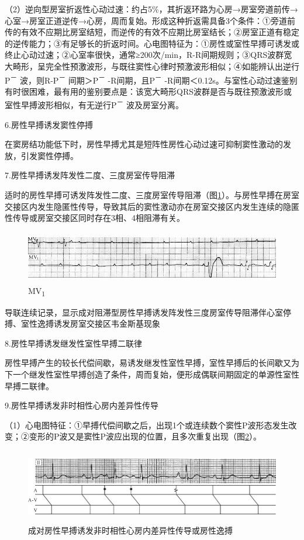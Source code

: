 （2）逆向型房室折返性心动过速：约占5\%，其折返环路为心房→房室旁道前传→心室→房室正道逆传→心房，周而复始。形成这种折返需具备3个条件：①旁道前传的有效不应期比房室结短，而逆传的有效不应期比房室结长；②房室正道有稳定的逆传能力；③有足够长的折返时间。心电图特征为：①房性或室性早搏可诱发或终止心动过速；②心室率很快，通常≥200次/min，R-R间期规则；③QRS波群宽大畸形，呈完全性预激波形，与既往窦性心律时预激波形相似；④如能辨认出逆行P\textsuperscript{－}
波，则R-P\textsuperscript{－} 间期＞P\textsuperscript{－}
-R间期，且P\textsuperscript{－}
-R间期＜0.12s。与室性心动过速鉴别有时很困难，最有用的鉴别要点是：该宽大畸形QRS波群是否与既往预激波形或室性早搏波形相似，有无逆行P\textsuperscript{－}
波及房室分离。

6.房性早搏诱发窦性停搏

在窦房结功能低下时，房性早搏尤其是短阵性房性心动过速可抑制窦性激动的发放，引发窦性停搏。

7.房性早搏诱发阵发性二度、三度房室传导阻滞

适时的房性早搏可诱发阵发性二度、三度房室传导阻滞（图\ref{fig11-14}）。与房性早搏在房室交接区内发生隐匿性传导，导致其后的窦性激动亦在房室交接区内发生连续的隐匿性传导或房室交接区同时存在3相、4相阻滞有关。

\begin{figure}[!htbp]
 \centering
 \includegraphics[width=5.5625in,height=0.90625in]{./images/Image00174.jpg}
 \captionsetup{justification=centering}
 \caption{MV\textsubscript{1}}
 \label{fig11-14}
  \end{figure} 
导联连续记录，显示成对阻滞型房性早搏诱发阵发性三度房室传导阻滞伴心室停搏、室性逸搏诱发房室交接区韦金斯基现象

8.房性早搏诱发继发性室性早搏二联律

房性早搏产生的较长代偿间歇，易诱发继发性室性早搏，室性早搏后的长间歇又为下一个继发性室性早搏创造了条件，周而复始，便形成偶联间期固定的单源性室性早搏二联律。

9.房性早搏诱发非时相性心房内差异性传导

（1）心电图特征：①早搏代偿间歇之后，出现1个或连续数个窦性P波形态发生改变；②变形的P波又是窦性P波应出现的位置，且多次重复出现（图\ref{fig11-15}）。

\begin{figure}[!htbp]
 \centering
 \includegraphics[width=5.75in,height=1.28125in]{./images/Image00175.jpg}
 \captionsetup{justification=centering}
 \caption{成对房性早搏诱发非时相性心房内差异性传导或房性逸搏}
 \label{fig11-15}
  \end{figure} 

